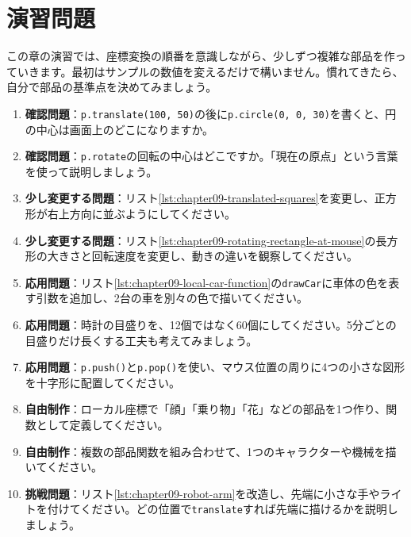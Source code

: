 \section{演習問題}

この章の演習では、座標変換の順番を意識しながら、少しずつ複雑な部品を作っていきます。最初はサンプルの数値を変えるだけで構いません。慣れてきたら、自分で部品の基準点を決めてみましょう。

\begin{enumerate}
    \item \textbf{確認問題}：\texttt{p.translate(100, 50)}の後に\texttt{p.circle(0, 0, 30)}を書くと、円の中心は画面上のどこになりますか。
    \item \textbf{確認問題}：\texttt{p.rotate}の回転の中心はどこですか。「現在の原点」という言葉を使って説明しましょう。
    \item \textbf{少し変更する問題}：リスト\ref{lst:chapter09-translated-squares}を変更し、正方形が右上方向に並ぶようにしてください。
    \item \textbf{少し変更する問題}：リスト\ref{lst:chapter09-rotating-rectangle-at-mouse}の長方形の大きさと回転速度を変更し、動きの違いを観察してください。
    \item \textbf{応用問題}：リスト\ref{lst:chapter09-local-car-function}の\texttt{drawCar}に車体の色を表す引数を追加し、2台の車を別々の色で描いてください。
    \item \textbf{応用問題}：時計の目盛りを、12個ではなく60個にしてください。5分ごとの目盛りだけ長くする工夫も考えてみましょう。
    \item \textbf{応用問題}：\texttt{p.push()}と\texttt{p.pop()}を使い、マウス位置の周りに4つの小さな図形を十字形に配置してください。
    \item \textbf{自由制作}：ローカル座標で「顔」「乗り物」「花」などの部品を1つ作り、関数として定義してください。
    \item \textbf{自由制作}：複数の部品関数を組み合わせて、1つのキャラクターや機械を描いてください。
    \item \textbf{挑戦問題}：リスト\ref{lst:chapter09-robot-arm}を改造し、先端に小さな手やライトを付けてください。どの位置で\texttt{translate}すれば先端に描けるかを説明しましょう。
\end{enumerate}

